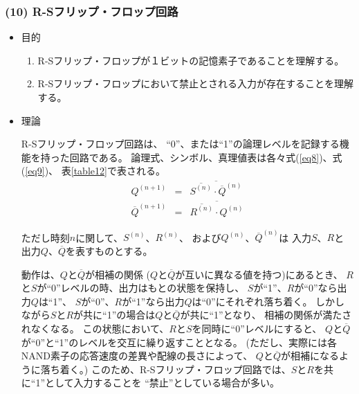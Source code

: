 \documentclass[12pt]{jarticle}
\begin{document}
\subsubsection*{(10) R-Sフリップ・フロップ回路}
\begin{itemize}
    \item 目的

          \begin{enumerate}
              \item R-Sフリップ・フロップが１ビットの記憶素子であることを理解する。
              \item R-Sフリップ・フロップにおいて禁止とされる入力が存在することを理解する。
          \end{enumerate}
    \item 理論

          R-Sフリップ・フロップ回路は、
          ``0''、または``1''の論理レベルを記録する機能を持った回路である。
          論理式、シンボル、真理値表は各々式(\ref{eq8})、式(\ref{eq9})、
          表\ref{table12}で表される。
          \begin{eqnarray}
              Q^{(n+1)} &=& \overline{\overline{S^{(n)}} \cdot {\overline{Q}}^{(n)}} \label{eq8} \\
              {\overline{Q}}^{(n+1)} &=& \overline{\overline{R^{(n)}} \cdot Q^{(n)}} \label{eq9}
          \end{eqnarray}

          ただし時刻$n$に関して、$S^{(n)}$、$R^{(n)}$、
          および$Q^{(n)}$、${\overline{Q}}^{(n)}$は
          入力$S$、$R$と出力$Q$、$\overline{Q}$を表すものとする。

          動作は、$Q$と$\overline{Q}$が相補の関係
          ($Q$と$\overline{Q}$が互いに異なる値を持つ)にあるとき、
          $R$と$S$が``0''レベルの時、出力はもとの状態を保持し、
          $S$が``1''、$R$が``0''なら出力$Q$は``1''、
          $S$が``0''、$R$が``1''なら出力$Q$は``0''にそれぞれ落ち着く。
          しかしながら$S$と$R$が共に``1''の場合は$Q$と$\overline{Q}$が共に``1''となり、
          相補の関係が満たされなくなる。
          この状態において、$R$と$S$を同時に``0''レベルにすると、
          $Q$と$\overline{Q}$が``0''と``1''のレベルを交互に繰り返すこととなる。
          (ただし、実際には各NAND素子の応答速度の差異や配線の長さによって、
          $Q$と$\overline{Q}$が相補になるように落ち着く。)
          このため、R-Sフリップ・フロップ回路では、$S$と$R$を共に``1''として入力することを
          ``禁止''としている場合が多い。


\end{itemize}
\end{document}

